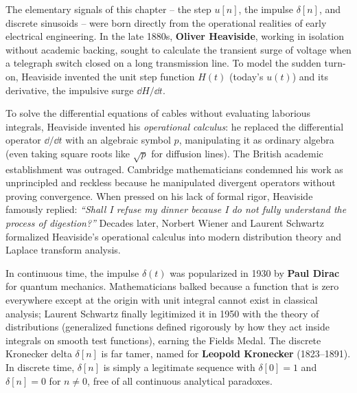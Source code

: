 \begin{historybox}
The elementary signals of this chapter -- the step $u[n]$, the impulse $\delta[n]$, and
discrete sinusoids -- were born directly from the operational realities of early electrical
engineering. In the late 1880s, \textbf{Oliver Heaviside}, working in isolation without academic
backing, sought to calculate the transient surge of voltage when a telegraph switch closed on a
long transmission line. To model the sudden turn-on, Heaviside invented the unit step function
$H(t)$ (today's $u(t)$) and its derivative, the impulsive surge $\dd H/\dd t$.

To solve the differential equations of cables without evaluating laborious integrals, Heaviside
invented his \emph{operational calculus}: he replaced the differential operator
$\dd/\dd t$ with an algebraic symbol $p$, manipulating it as ordinary algebra (even taking square
roots like $\sqrt{p}$ for diffusion lines). The British academic establishment was outraged.
Cambridge mathematicians condemned his work as unprincipled and reckless because he manipulated
divergent operators without proving convergence. When pressed on his lack of formal rigor,
Heaviside famously replied: \emph{``Shall I refuse my dinner because I do not fully
understand the process of digestion?''} Decades later, Norbert Wiener and Laurent Schwartz
formalized Heaviside's operational calculus into modern distribution theory and Laplace transform
analysis.

In continuous time, the impulse $\delta(t)$ was popularized in 1930 by \textbf{Paul Dirac} for
quantum mechanics. Mathematicians balked because a function that is zero everywhere except at the
origin with unit integral cannot exist in classical analysis; Laurent Schwartz finally legitimized
it in 1950 with the theory of distributions (generalized functions defined rigorously by how they
act inside integrals on smooth test functions), earning the Fields Medal. The discrete Kronecker
delta $\delta[n]$ is far tamer, named for \textbf{Leopold Kronecker} (1823--1891). In discrete
time, $\delta[n]$ is simply a legitimate sequence with $\delta[0]=1$ and $\delta[n]=0$ for $n \ne 0$,
free of all continuous analytical paradoxes.
\end{historybox}

